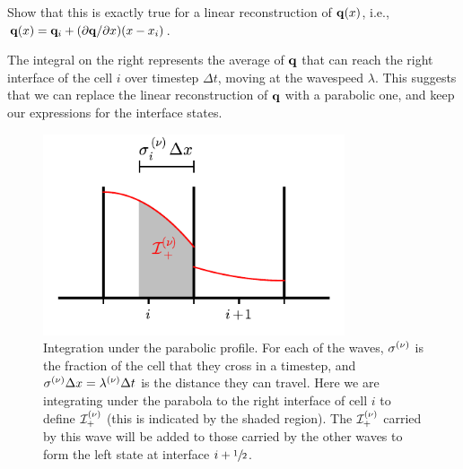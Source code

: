 \begin{exercise}
{Show that this is exactly true for a linear reconstruction of ${\bf q}(x)$, i.e.,
${\bf q}(x) = {\bf q}_i + (\partial {\bf q}/\partial x) (x - x_i)$.}
\end{exercise}

\noindent The integral on the right represents the average of ${\bf q}$ that
can reach the right interface of the cell $i$ over timestep $\Delta
t$, moving at the wavespeed $\lambda$.  This suggests that we can
replace the linear reconstruction of ${\bf q}$ with a parabolic one, and
keep our expressions for the interface states.

\begin{figure}
\centering
\includegraphics[width=3.5in]{ppm-trace}
\caption[Integration under the parabola profile for to an
  interface]{\label{fig:ppm_trace} Integration under the parabolic
  profile.  For each of the waves, $\sigma^{(\nu)}$ is the fraction of
  the cell that they cross in a timestep, and $\sigma^{(\nu)} \Delta x =
  \lambda^{(\nu)} \Delta t$ is the distance they can travel.  Here we are
  integrating under the parabola to the right interface of cell $i$ to
  define ${\mathcal{I}}_+^{(\nu)}$ (this is indicated by the shaded
  region).  The ${\mathcal{I}}_+^{(\nu)}$ carried by this wave will be
  added to those carried by the other waves to form the left state at
  interface $i+{\sfrac{1}{2}}$.}
\end{figure}


